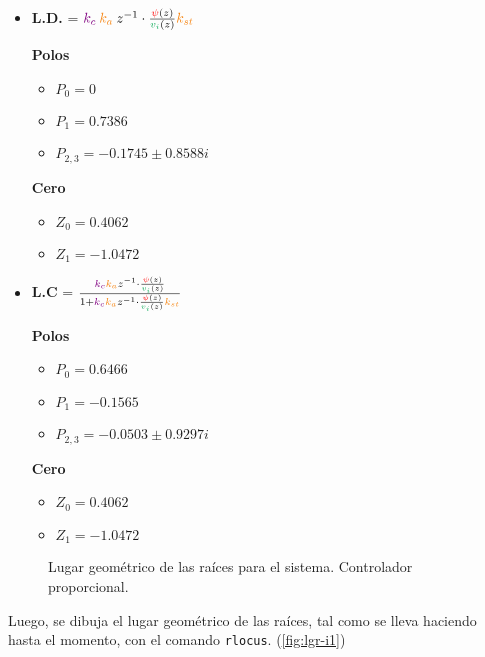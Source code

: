 \begin{itemize}
  \item \textbf{L.D.} = \( \mora{k_{c}} \nara{ k_{a}} z^{-1} \cdot \frac{\rojo{\psi}(z)}{\verd{v_i}(z)} \nara{k_{st}} \) 
 
  \begin{multicols}{2}
    \textbf{Polos}
    \begin{itemize}
      \item \(P_{0} = 0 \)
      \item \(P_{1} = 0.7386\)
      \item \(P_{2,3} = -0.1745 \pm 0.8588i\) 
    \end{itemize}
    \columnbreak
    \textbf{Cero}
    \begin{itemize}
      \item \(Z_0 = 0.4062\)
      \item \(Z_1 = -1.0472\)
    \end{itemize}
  \end{multicols}
  
  \item \textbf{L.C} =  \(\frac{  \mora{k_{c}} \nara{ k_{a}} z^{-1} \cdot \frac{\rojo{\psi}(z)}{\verd{v_i}(z)}} {1+ \mora{k_{c}} \nara{ k_{a}} z^{-1} \cdot \frac{\rojo{\psi}(z)}{\verd{v_i}(z)} \nara{k_{st}} }  \)
  
  \begin{multicols}{2}
    \textbf{Polos}
    \begin{itemize}
      \item \(P_{0} = 0.6466 \)
      \item \(P_{1} = -0.1565\)
      \item \(P_{2,3} = -0.0503 \pm 0.9297i\) 
    \end{itemize}
    \columnbreak
    \textbf{Cero}
    \begin{itemize}
      \item \(Z_0 = 0.4062\)
      \item \(Z_1 = -1.0472\)
    \end{itemize}
  \end{multicols}
\end{itemize}

\begin{figure}[ht]
    \centering
    
    \caption{Lugar geométrico de las raíces para el sistema. Controlador proporcional.}
    \label{fig:lgr-i1}
\end{figure}

Luego, se dibuja el lugar geométrico de las raíces, tal como se lleva haciendo
hasta el momento, con el comando \verb|rlocus|. (\autoref{fig:lgr-i1})
\newpage

